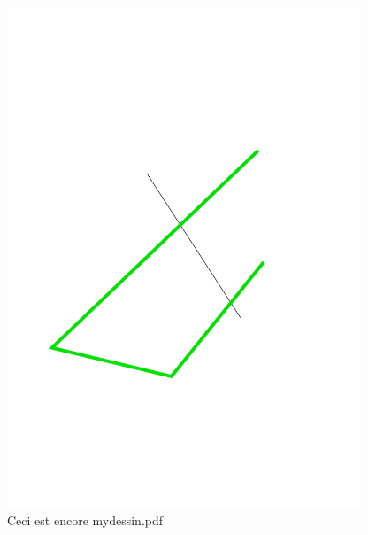 \begin{figure}[!h]
\centering
\includegraphics[width=300pt]{mydessin.pdf}
\caption{Ceci est encore mydessin.pdf}
\label{mydessin3}
\end{figure}

